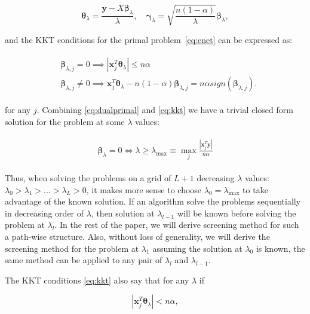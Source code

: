\begin{equation}
    \label{eq:dualprimal}
    \boldsymbol\theta_\lambda=\frac{\boldsymbol y-X\boldsymbol\beta_\lambda}{\lambda},\quad \boldsymbol\gamma_\lambda=\sqrt{\frac{n(1-\alpha)}{\lambda}}\boldsymbol\beta_\lambda,
\end{equation}

and the KKT conditions for the primal problem~\eqref{eq:enet} can be expressed as:

\begin{gather}
    \label{eq:kkt}
    \begin{aligned}&\boldsymbol\beta_{\lambda,j}=0\implies|\boldsymbol x_j^T\boldsymbol\theta_\lambda|\leq n\alpha\\
    & \boldsymbol\beta_{\lambda,j}\neq0\implies  \boldsymbol x_j^T\boldsymbol\theta_\lambda-n(1-\alpha)\boldsymbol\beta_{\lambda,j}=n\alpha\textit{sign}(\boldsymbol\beta_{\lambda,j}).
    \end{aligned}
\end{gather}

for any $j$. Combining \eqref{eq:dualprimal} and \eqref{eq:kkt} we have a trivial closed form solution for the problem at some $\lambda$ values:

\begin{gather}
    \label{eq:lammax}
    \begin{aligned}
        \boldsymbol\beta_\lambda=0\iff \lambda \geq \lambda_{\max}\equiv \max_j \frac{|\boldsymbol x_j^T\boldsymbol y|}{n\alpha}
    \end{aligned}
\end{gather}

Thus, when solving the problems on a grid of $L+1$ decreasing $\lambda$ values: $\lambda_0>\lambda_1>...>\lambda_L>0$, it makes more sense to choose $\lambda_0= \lambda_{\max}$ to take advantage of the known solution. If an algorithm solve the problems sequentially in decreasing order of $\lambda$, then solution at $\lambda_{l-1}$ will be known before solving the problem at $\lambda_l$. In the rest of the paper, we will derive screening method for such a path-wise structure. Also, without loss of generality, we will derive the screening method for the problem at $\lambda_1$ assuming the solution at $\lambda_0$ is known, the same method can be applied to any pair of $\lambda_{l}$ and $\lambda_{l-1}$.

The KKT conditions \eqref{eq:kkt} also say that for any $\lambda$ if 

\begin{equation}
    \label{eq:disc_cond}
    |\boldsymbol x_j^T\boldsymbol\theta_{\lambda}|<n\alpha,
\end{equation}

